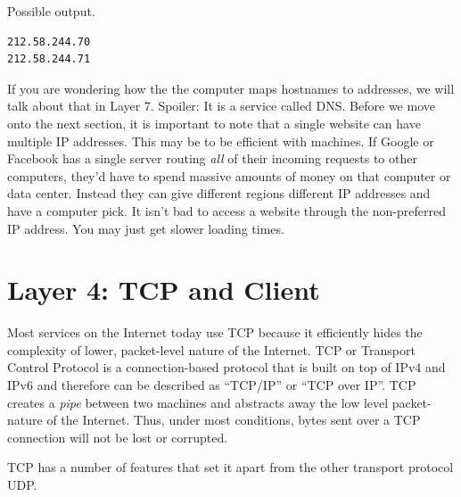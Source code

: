 Possible output.

\begin{lstlisting}
212.58.244.70
212.58.244.71
\end{lstlisting}

If you are wondering how the the computer maps \gls{hostnames} to addresses, we will talk about that in Layer 7.
Spoiler: It is a service called \gls{DNS}.
Before we move onto the next section, it is important to note that a single website can have multiple IP addresses.
This may be to be efficient with machines.
If Google or Facebook has a single server routing \textit{all} of their incoming requests to other computers, they'd have to spend massive amounts of money on that computer or data center.
Instead they can give different regions different IP addresses and have a computer pick.
It isn't bad to access a website through the non-preferred IP address.
You may just get slower loading times.

\section{Layer 4: TCP and Client}

Most services on the Internet today use \gls{TCP} because it efficiently hides the complexity of lower, packet-level nature of the Internet.
TCP or Transport Control Protocol is a connection-based protocol that is built on top of IPv4 and IPv6 and therefore can be described as ``TCP/IP'' or ``TCP over IP''.
TCP creates a \emph{pipe} between two machines and abstracts away the low level packet-nature of the Internet. Thus, under most conditions, bytes sent over a TCP connection will not be lost or corrupted.

TCP has a number of features that set it apart from the other transport protocol UDP.

